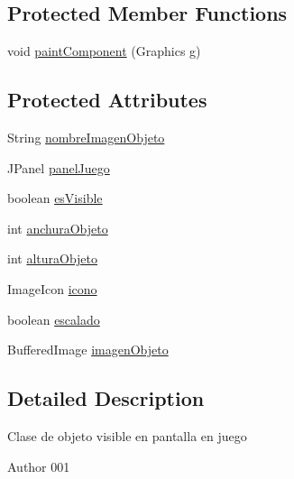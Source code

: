 \subsection*{Protected Member Functions}
\begin{DoxyCompactItemize}
\item 
void \hyperlink{classmain_1_1java_1_1es_1_1deusto_1_1spq_1_1windows_1_1_objeto_grafico_aa524727f2facdc9ae5ae7f7d5e5c490e}{paint\+Component} (Graphics g)
\end{DoxyCompactItemize}
\subsection*{Protected Attributes}
\begin{DoxyCompactItemize}
\item 
String \hyperlink{classmain_1_1java_1_1es_1_1deusto_1_1spq_1_1windows_1_1_objeto_grafico_aaf5e1e8c4ebff8a39c72b07c8af6ca86}{nombre\+Imagen\+Objeto}
\item 
J\+Panel \hyperlink{classmain_1_1java_1_1es_1_1deusto_1_1spq_1_1windows_1_1_objeto_grafico_a59e4c02190cec52f781b454584c2566a}{panel\+Juego}
\item 
boolean \hyperlink{classmain_1_1java_1_1es_1_1deusto_1_1spq_1_1windows_1_1_objeto_grafico_a87de9fa710e3a57cda731cba8a2c5bde}{es\+Visible}
\item 
int \hyperlink{classmain_1_1java_1_1es_1_1deusto_1_1spq_1_1windows_1_1_objeto_grafico_a5beac5851a3a53b84e12a0d46ab0d233}{anchura\+Objeto}
\item 
int \hyperlink{classmain_1_1java_1_1es_1_1deusto_1_1spq_1_1windows_1_1_objeto_grafico_a5dad55f2e39a93a3da737641faf4b123}{altura\+Objeto}
\item 
Image\+Icon \hyperlink{classmain_1_1java_1_1es_1_1deusto_1_1spq_1_1windows_1_1_objeto_grafico_a28289aaee40dfd19df3f653f30048176}{icono}
\item 
boolean \hyperlink{classmain_1_1java_1_1es_1_1deusto_1_1spq_1_1windows_1_1_objeto_grafico_a751c7dffa70c3f3da364d7fef5f8e0c4}{escalado}
\item 
Buffered\+Image \hyperlink{classmain_1_1java_1_1es_1_1deusto_1_1spq_1_1windows_1_1_objeto_grafico_ac0b5a00ee1ef9e9604b1cfb017c24f52}{imagen\+Objeto}
\end{DoxyCompactItemize}


\subsection{Detailed Description}
Clase de objeto visible en pantalla en juego \begin{DoxyAuthor}{Author}
001 
\end{DoxyAuthor}


